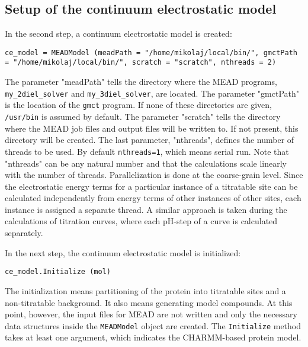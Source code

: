 \documentclass[a4paper,11pt]{article}
\begin{document}
\subsection{Setup of the continuum electrostatic model}
In the second step, a continuum electrostatic model is created:

{\footnotesize \begin{lstlisting}
ce_model = MEADModel (meadPath = "/home/mikolaj/local/bin/", gmctPath = "/home/mikolaj/local/bin/", scratch = "scratch", nthreads = 2)
\end{lstlisting} }

\bigskip
The parameter "meadPath" tells the directory where the MEAD programs,
\texttt{my\_2diel\_solver} and \texttt{my\_3diel\_solver}, are located.
%
The parameter "gmctPath" is the location of the \texttt{gmct} program.
%
If none of these directories are given, \texttt{/usr/bin} is assumed
by default.
%
The parameter "scratch" tells the directory where the MEAD job files
and output files will be written to.
%
If not present, this directory will be created.
%
The last parameter, "nthreads", defines the number of threads to be used.
%
By default \texttt{nthreads=1}, which means serial run.
%
Note that "nthreads" can be any natural number and that the calculations
scale linearly with the number of threads.
%
Parallelization is done at the coarse-grain level.
%
Since the electrostatic energy terms for a particular instance of a titratable
site can be calculated independently from energy terms of other instances of other
sites, each instance is assigned a separate thread.
%
A similar approach is taken during the calculations of titration curves,
where each pH-step of a curve is calculated separately.


\bigskip
In the next step, the continuum electrostatic model is initialized:

{\footnotesize \begin{lstlisting}
ce_model.Initialize (mol)
\end{lstlisting} }

\bigskip
The initialization means partitioning of the protein into titratable sites and
a non-titratable background.
%
It also means generating model compounds.
%
At this point, however, the input files for MEAD are not written and only
the necessary data structures inside the \texttt{MEADModel} object are created.
%
The \texttt{Initialize} method takes at least one argument,
which indicates the CHARMM-based protein model.
\end{document}
